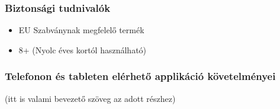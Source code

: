\documentclass{article}
\begin{document}
\subsubsection{Biztonsági tudnivalók}
\begin{itemize}
    \item EU Szabványnak megfelelő termék
    \item 8+ (Nyolc éves kortól használható)
\end{itemize}


\subsubsection{Telefonon és tableten elérhető applikáció követelményei}

(itt is valami bevezető szöveg az adott részhez)
\end{document}
